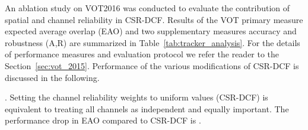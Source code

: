 \documentclass[twocolumn]{article}
\newcommand*\circledd[1]{\tikz[baseline=(char.base)]{
            \node[shape=circle,draw,inner sep=0.15pt] (char) {#1};}}
\newcommand{\first}[1]{{\raisebox{0.8pt}{\footnotesize \color{gold} \circledd{1}}\hspace{3.5pt}#1}}
\newcommand{\second}[1]{{\raisebox{0.8pt}{\footnotesize \color{silver} \circledd{2}}\hspace{3.5pt}#1}}
\newcommand{\third}[1]{{\raisebox{0.8pt}{\footnotesize \color{bronze} \circledd{3}}\hspace{3.5pt}#1}}
\newcommand{\first}[1]{\bf{\color{red}#1}}
\newcommand{\second}[1]{\em{\color{blue}#1}}
\newcommand{\third}[1]{{\color{green}#1}}
\begin{document}
\begin{comment}
An ablation study on VOT2016 (see Sect.~\ref{sec:vot_2016} for details of the evaluation protocol) was conducted to evaluate the contribution of spatial and channel reliability measures in our CSR-DCF. Results of the VOT primary measure EAO and two supplementary measures (A,R) are summarized in Table~\ref{tab:tracker_analysis}. Setting the adaptive channel reliability weights to uniform values (CuSR-DCF) results in  performance drop in EAO compared to CSR-DCF. Replacing the adaptive spatial reliability map in CSR-CDF by a constant map with uniform values within the bounding box and zeros elsewhere (CSuR-DCF), results in a  drop in EAO. Making both replacements in CSR-DCF (CuSuR-DCF) results in  drop. Removing the channel and spatial reliability map reduces our tracker to a standard DCF with a large receptive field -- the performance drops by over . 
\begin{table}\setlength{\tabcolsep}{14pt}
\begin{center}
\caption{Ablation study of CSR-DCF.}
\label{tab:tracker_analysis}
\begin{tabular*}{1\linewidth}{l c c c}
\hline
 Tracker & EAO &  &  \\
\hline
CSR-DCF & \first{0.338} & \first{0.85} & \first{0.51} \\
CuSR-DCF & \second{0.297} & \second{1.08} & \second{0.51} \\
CSuR-DCF & \third{0.264} & \third{1.18} & \third{0.49} \\
CuSuR-DCF & 0.256 & 1.33 & \second{0.51} \\
DCF & 0.152 & 2.85 & 0.47 \\
\hline
\end{tabular*}
\end{center}
\end{table}
\end{comment}

An ablation study on VOT2016 was conducted to evaluate the contribution of spatial and channel reliability in CSR-DCF. Results of the VOT primary measure expected average overlap (EAO) and two supplementary measures accuracy and robustness (A,R) are summarized in Table~\ref{tab:tracker_analysis}. For the details of  performance measures and evaluation protocol we refer the reader to the Section~\ref{sec:vot_2015}. Performance of the various modifications of  CSR-DCF is discussed in the following.

.
Setting the channel reliability weights to uniform values (CSR-DCF) is equivalent to treating all channels as independent and equally important. The performance drop in EAO compared to CSR-DCF is .
\end{document}
